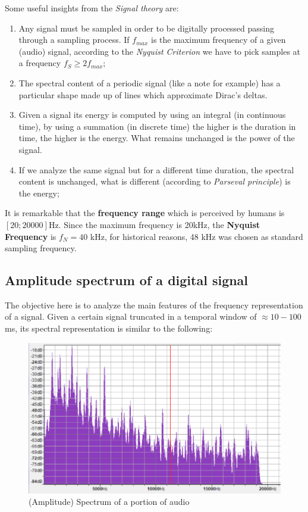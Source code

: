 \noindent
Some useful insights from the \textit{Signal theory} are:
\begin{enumerate}
    \itemsep-0.3em 
    \item Any signal must be sampled in order to be digitally processed passing through a sampling process. If $f_{max}$ is the maximum frequency of a given (audio) signal, according to the \textit{Nyquist Criterion} we have to pick samples at a frequency $f_S\ge 2f_{max}$;
    \item The spectral content of a periodic signal (like a note for example) has a particular shape made up of lines which approximate Dirac's deltas.
    \item Given a signal its energy is computed by using an integral (in continuous time), by using a summation (in discrete time) the higher is the duration in time, the higher is the energy. What remains unchanged is the power of the signal.
    \item If we analyze the same signal but for a different time duration, the spectral content is unchanged, what is different (according to \textit{Parseval principle}) is the energy; 
\end{enumerate}

\noindent
It is remarkable that the \textbf{frequency range} which is perceived by humans is $[20;20000]$Hz. Since the maximum frequency is 20kHz, the \textbf{Nyquist Frequency} is $f_N=40$ kHz, for historical reasons, 48 kHz was chosen as standard sampling frequency.

\subsection{Amplitude spectrum of a digital signal}
The objective here is to analyze the main features of the frequency representation of a signal. Given a certain signal truncated in a temporal window of $\approx 10-100$ms, its spectral representation is similar to the following: 

\begin{figure}
    \centering
    \includegraphics[scale=0.7]{img/Spectrum_linear.png}
    \caption{(Amplitude) Spectrum of a portion of audio}
    \label{fig:Spectrum_linear}
\end{figure}

